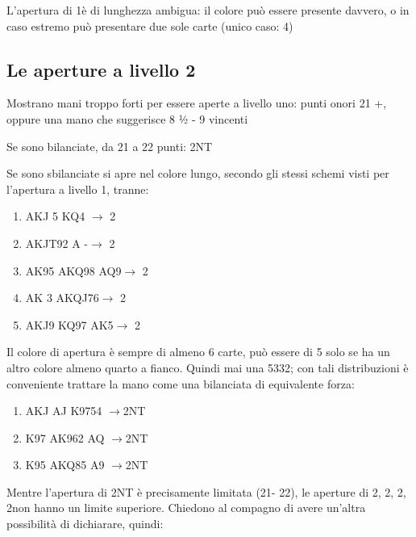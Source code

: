 \documentclass[../corsofiori.tex]{subfiles}
\begin{document}
L’apertura di 1\Cl è di lunghezza ambigua: il colore può essere presente davvero, o in caso estremo può presentare due
sole carte (unico caso: 4\Cl) 
\subsection{
Le aperture a livello 2
}
Mostrano mani troppo forti per essere aperte a livello uno:
punti onori 21 +, oppure una mano che suggerisce 8 ½ - 9 vincenti

Se sono bilanciate, da 21 a 22 punti: 2NT

Se sono sbilanciate si apre nel colore lungo, secondo gli stessi schemi visti per l’apertura a livello 1, tranne:
    
\begin{enumerate}[label={}]

\item {} {AKJ} {5} {KQ4} $\rightarrow$ 2\Sp

\item {} {AKJT92} {A} {-}$\rightarrow$ 2\Sp

\item {} {AK95} {AKQ98} {AQ9}$\rightarrow$ 2\Di

\item {} {AK} {3} {AKQJ76}$\rightarrow$ 2\Cl

\item {} {AKJ9} {KQ97} {AK5}$\rightarrow$ 2\Cl 

\end{enumerate}
Il colore di apertura è sempre di almeno 6 carte, può essere di 5 solo se ha un altro
colore almeno quarto a fianco. Quindi mai una 5332; con tali distribuzioni è
conveniente trattare la mano come una bilanciata di equivalente forza:
\begin{enumerate}[label={}]
\item {} {AKJ} {AJ} {K9754} $\rightarrow$2NT

\item {} {K97} {AK962} {AQ} $\rightarrow$2NT

\item {} {K95} {AKQ85} {A9} $\rightarrow$2NT

\end{enumerate}
Mentre l’apertura di 2NT è
precisamente limitata (21- 22), le
aperture di 2\Cl, 2\Di, 2\He, 2\Sp non
hanno un limite superiore.
Chiedono al compagno di avere
un’altra possibilità di dichiarare,
quindi:
\end{document}
